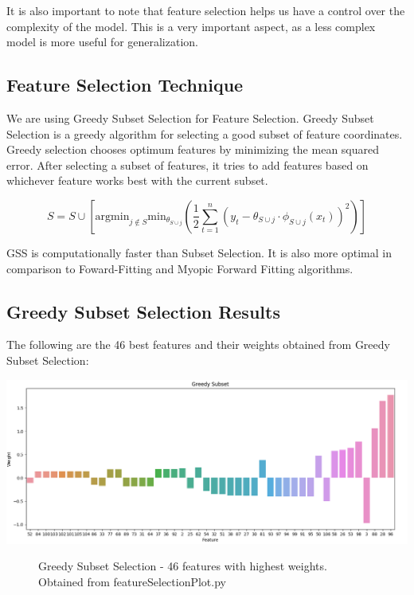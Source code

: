 \documentclass[fleqn]{article}
\begin{document}
    It is also important to note that feature selection helps us have a control over the
    complexity of the model. This is a very important aspect, as a less complex model
    is more useful for generalization.

    \subsection{Feature Selection Technique}
    We are using Greedy Subset Selection for Feature Selection. Greedy Subset Selection is
    a greedy algorithm for selecting a good subset of feature coordinates. Greedy selection
    chooses optimum features by minimizing the mean squared error. After selecting a subset
    of features, it tries to add features based on whichever feature works best with the
    current subset.

        $$ S = S \cup \left[\text{argmin}_{j\notin S} \text{min}_{\theta_{S\cup j}}\left(\frac{1}{2}
        \sum_{t=1}^n (y_t-\theta_{S\cup j}\cdot\phi_{S\cup j}(x_t))^2\right)\right] $$

    \noindent
    GSS is computationally faster than Subset Selection. It is also more optimal
    in comparison to Foward-Fitting and Myopic Forward Fitting algorithms.

    \subsection{Greedy Subset Selection Results}
    The following are the 46 best features and their weights obtained from Greedy Subset
    Selection:
    \begin{center}
        \includegraphics[scale=0.5]{46.png}
        \begin{figure}[!h]
            \caption{Greedy Subset Selection - 46 features with highest weights. Obtained from featureSelectionPlot.py}
        \end{figure}
    \end{center}
\end{document}
